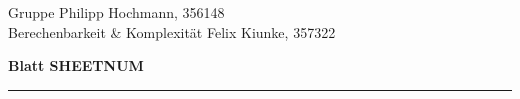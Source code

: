 \documentclass[a4paper,graphics,11pt]{article}
\begin{document}
\noindent Gruppe              \hfill Philipp Hochmann, 356148 \\
\noindent Berechenbarkeit \& Komplexität \hfill Felix Kiunke, 357322 \\

\begin{center}
	\LARGE{\textbf{Blatt SHEETNUM}}
\end{center}
\begin{center}
\rule[0.1ex]{\textwidth}{1pt}
\end{center}

\end{document}
